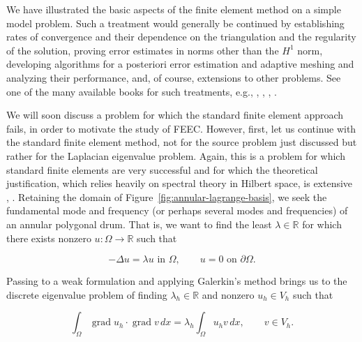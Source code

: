 {We have illustrated the basic aspects of the finite element method on a simple model problem. Such a treatment would generally be continued by establishing rates of convergence and their dependence on the triangulation and the regularity of the solution, proving error estimates in norms other than the $H^1$ norm, developing algorithms for a posteriori error estimation and adaptive meshing and analyzing their performance, and, of course, extensions to other problems. See one of the many available books for such treatments, e.g., , , , .}

{We will soon discuss a problem for which the standard finite element approach fails, in order to motivate the study of FEEC. However, first, let us continue with the standard finite element method, not for the source problem just discussed but rather for the Laplacian eigenvalue problem. Again, this is a problem for which standard finite elements are very successful and for which the theoretical justification, which relies heavily on spectral theory in Hilbert space, is extensive , . Retaining the domain of Figure~\ref{fig:annular-lagrange-basis}, we seek the fundamental mode and frequency (or perhaps several modes and frequencies) of an annular polygonal drum. That is, we want to find the least $\lambda\in\mathbb R$ for which there exists nonzero $u:\Omega\to\mathbb R$ such that}

\begin{equation}\label{eq:scalar-laplacian-eigenproblem}
-\Delta u=\lambda u\text{{ in }}\Omega,\qquad u=0\text{{ on }}\partial\Omega.
\end{equation}

{Passing to a weak formulation and applying Galerkin's method brings us to the discrete eigenvalue problem of finding $\lambda_h\in\mathbb R$ and nonzero $u_h\in V_h$ such that}

\[
\int_\Omega\operatorname{grad}u_h\cdot\operatorname{grad}v\,dx=\lambda_h\int_\Omega u_hv\,dx,\qquad v\in V_h.
\]

